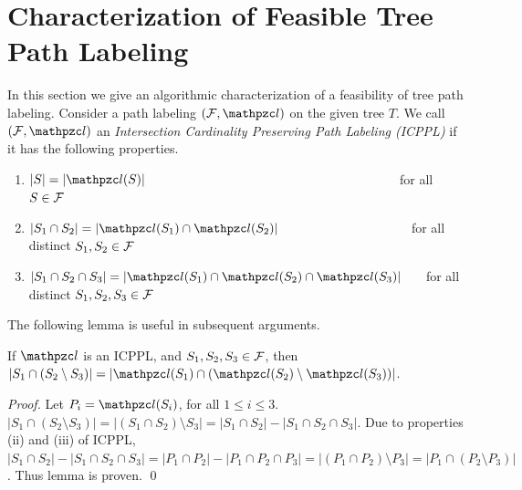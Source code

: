 \documentclass[MS]             %
              {iitmdiss_as}    %
\begin{document}




\section{Characterization of Feasible Tree Path  Labeling} 
\label{sec:feasible} 

In this section we give an algorithmic characterization of a
feasibility of tree path labeling.
Consider a path labeling $(\cF, \cl)$ on the
given tree $T$. We call $(\cF, \cl)$ an {\em Intersection Cardinality
  Preserving Path Labeling (ICPPL)} if it has the following
properties.


\begin{enumerate}[{(\icpplpr\ }i) \ \ \ ]
\item \label{pr:i} $|S| = |\cl(S)|$ \ \ \ \ \ \ \ \ \ \ \ \ \ \ \ \ \ \ \ \ \ \ \ \
  \ \ \ \ \ \ \ \ \ \ \ \ \ \ \ for all $S \in {\cal F}$
\item \label{pr:ii}$|S_1 \cap S_2| = |\cl(S_1) \cap \cl(S_2)|$ \ \ \ \ \ \ \ \ \ \
  \ \ \ \ \ \ \ \ \ \ for all distinct
  $S_1, S_2 \in {\cal F}$
\item \label{pr:iii}$|S_1 \cap S_2 \cap S_3| = |\cl(S_1) \cap \cl(S_2) \cap
  \cl(S_3)|$ \ \ \ for all distinct $S_1, S_2, S_3 \in
  {\cal F}$
\end{enumerate}


\noindent
The following lemma is useful in subsequent arguments. 
\begin{lemma}
  \label{lem:setminuscard}
  If $\cl$ is an ICPPL, and $S_1, S_2, S_3 \in {\cal F}$, then $|S_1 \cap
  (S_2 \setminus S_3)| = |\cl(S_1) \cap (\cl(S_2) \setminus
  \cl(S_3))|$.
\end{lemma}
\begin{proof}%
  Let $P_i = \cl(S_i)$, for all $1 \le i \le  3$.
  $|S_1 \cap (S_2 \setminus S_3)| = |(S_1 \cap S_2) \setminus S_3| =
  |S_1 \cap S_2| - |S_1 \cap S_2 \cap S_3|$. Due to properties (ii)
  and (iii) of ICPPL, $|S_1 \cap S_2| - |S_1 \cap S_2 \cap S_3| = |P_1
  \cap P_2| - |P_1 \cap P_2 \cap P_3| = |(P_1 \cap P_2) \setminus P_3|
  = |P_1 \cap (P_2 \setminus P_3)|$. Thus lemma is proven. \qed
\end{proof}
\end{document}
